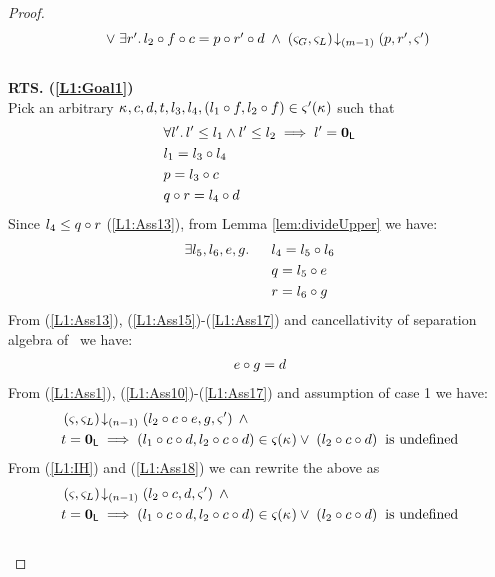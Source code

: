 \begin{lemma}
\begin{proof}
\begin{align}
\begin{array}{l}
		\hspace*{0.4cm}\lor\; \exists r'.\, l_2 \circ f \circ c = p \circ r' \circ d \;\land\; \left(\varsigma_{G}, \varsigma_{L}\right) \!\downarrow_{(m-1)} \left(p, r', \varsigma_{}'\right)
	\end{array}
	\label{L1:Goal2}\\\nonumber
\end{align}
%
\textbf{RTS. (\ref{L1:Goal1})}\\
Pick an arbitrary $\kappa_{}, c, d, t, l_3, l_4, (l_1 \circ f, l_2 \circ f) \in \varsigma_{}'(\kappa_{})$ such that
%
\begin{align}
	&\forall l'.\, l' \leq l_1 \land l' \leq l_2 \implies l' = \mathbf{0}_{\textsf{L}} \label{L1:Ass10}\\
	& l_1 = l_3 \circ l_4 \label{L1:Ass11}\\
	& p = l_3 \circ c \label{L1:Ass12}\\
	& q \circ r = l_4 \circ d \label{L1:Ass13}
\end{align}
Since $l_4 \leq q \circ r$ (\ref{L1:Ass13}), from Lemma \ref{lem:divideUpper} we have:
%
\begin{align}
	\exists l_5, l_6, e, g.\, \hspace*{0.5cm} & l_4 = l_5 \circ l_6 \label{L1:Ass15}\\
	& q = l_5 \circ e \label{L1:Ass16}\\
	& r = l_6 \circ g \label{L1:Ass17}
\end{align}
%
From (\ref{L1:Ass13}), (\ref{L1:Ass15})-(\ref{L1:Ass17}) and cancellativity of separation algebra of \LStates\ we have:
%
\begin{align}
	e \circ g = d \label{L1:Ass18}
\end{align}
%
From (\ref{L1:Ass1}), (\ref{L1:Ass10})-(\ref{L1:Ass17}) and assumption of case 1 we have:
%
\begin{align}
	&\left(\varsigma_{}, \varsigma_{L}\right) \!\downarrow_{(n-1)} \left(l_2 \circ c \circ e, g, \varsigma_{}'\right) \;\land \nonumber\\
	& t = \mathbf{0}_{\textsf{L}} \implies (l_1 \circ c \circ  d, l_2 \circ c \circ d) \in \varsigma_{}(\kappa_{}) \lor\; (l_2 \circ c \circ d) \hspace*{0.2cm}\text{is undefined} \nonumber
\end{align}
From (\ref{L1:IH}) and (\ref{L1:Ass18}) we can rewrite the above as 
%
\begin{align}
	&\left(\varsigma_{}, \varsigma_{L}\right) \!\downarrow_{(n-1)} \left(l_2 \circ c, d, \varsigma_{}'\right) \;\land \nonumber\\
	& t = \mathbf{0}_{\textsf{L}} \implies (l_1 \circ c \circ  d, l_2 \circ c \circ d) \in \varsigma_{}(\kappa_{}) \lor\; (l_2 \circ c \circ d) \hspace*{0.2cm}\text{is undefined} \nonumber
\end{align}\\
%
%
%
%


\end{proof}
\end{lemma}
